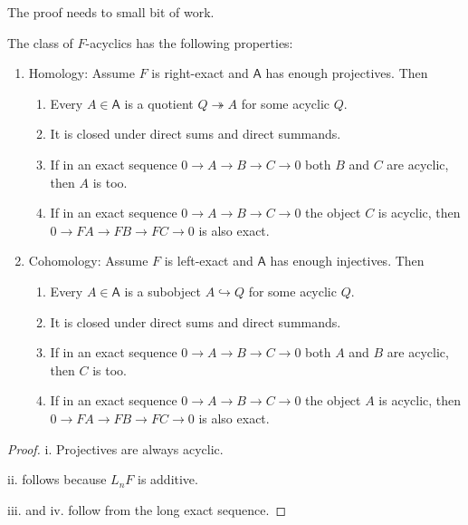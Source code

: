 \documentclass[fontsize=11pt,fleqn,a4paper]{scrartcl}
\begin{document}
The proof needs to small bit of work.

\begin{lemma}
The class of $F$-acyclics has the following properties:
\begin{multicols}{2}
\begin{enumerate}
\item Homology: Assume $F$ is right-exact and $\mathsf{A}$ has enough projectives. Then
\begin{enumerate}
\item Every $A\in\mathsf{A}$ is a quotient $Q\twoheadrightarrow A$ for some acyclic $Q$.
\item It is closed under direct sums and direct summands.
\item If in an exact sequence $0\to A\to B\to C\to 0$ both $B$ and $C$ are acyclic, then $A$ is too.
\item If in an exact sequence $0\to A\to B\to C\to 0$ the object $C$ is acyclic, then $0\to FA\to FB\to FC\to 0$ is also exact.
\end{enumerate}
\item Cohomology: Assume $F$ is left-exact and $\mathsf{A}$ has enough injectives. Then
\begin{enumerate}
\item Every $A\in\mathsf{A}$ is a subobject $A \hookrightarrow Q$ for some acyclic $Q$.
\item It is closed under direct sums and direct summands.
\item If in an exact sequence $0\to A\to B\to C\to 0$ both $A$ and $B$ are acyclic, then $C$ is too.
\item If in an exact sequence $0\to A\to B\to C\to 0$ the object $A$ is acyclic, then $0\to FA\to FB\to FC\to 0$ is also exact.
\end{enumerate}
\end{enumerate}
\end{multicols}
\end{lemma}
\begin{proof}
i. Projectives are always acyclic.

ii. follows because $L_n F$ is additive.

iii. and iv. follow from the long exact sequence.
\end{proof}
\end{document}
